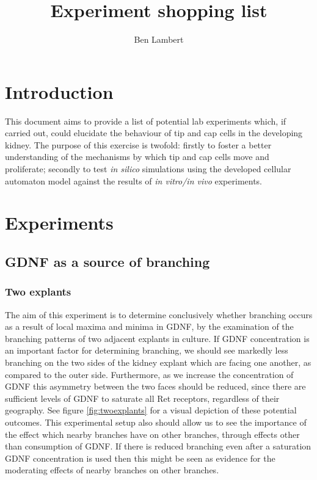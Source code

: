 \documentclass[pdftex,10pt,a4paper]{article}
\title{\textbf{Experiment shopping list}}
\author{Ben Lambert}
\begin{document}
\maketitle
\doublespacing
\section{Introduction}
This document aims to provide a list of potential lab experiments which, if carried out, could elucidate the behaviour of tip and cap cells in the developing kidney. The purpose of this exercise is twofold: firstly to foster a better understanding of the mechanisms by which tip and cap cells move and proliferate; secondly to test \textit{in silico} simulations using the developed cellular automaton model against the results of \textit{in vitro/in vivo} experiments.

\section{Experiments}
\subsection{GDNF as a source of branching}
\subsubsection{Two explants}
The aim of this experiment is to determine conclusively whether branching occurs as a result of local maxima and minima in GDNF, by the examination of the branching patterns of two adjacent explants in culture. If GDNF concentration is an important factor for determining branching, we should see markedly less branching on the two sides of the kidney explant which are facing one another, as compared to the outer side. Furthermore, as we increase the concentration of GDNF this asymmetry between the two faces should be reduced, since there are sufficient levels of GDNF to saturate all Ret receptors, regardless of their geography. See figure \ref{fig:twoexplants} for a visual depiction of these potential outcomes. This experimental setup also should allow us to see the importance of the effect which nearby branches have on other branches, through effects other than consumption of GDNF. If there is reduced branching even after a saturation GDNF concentration is used then this might be seen as evidence for the moderating effects of nearby branches on other branches.
\end{document}
